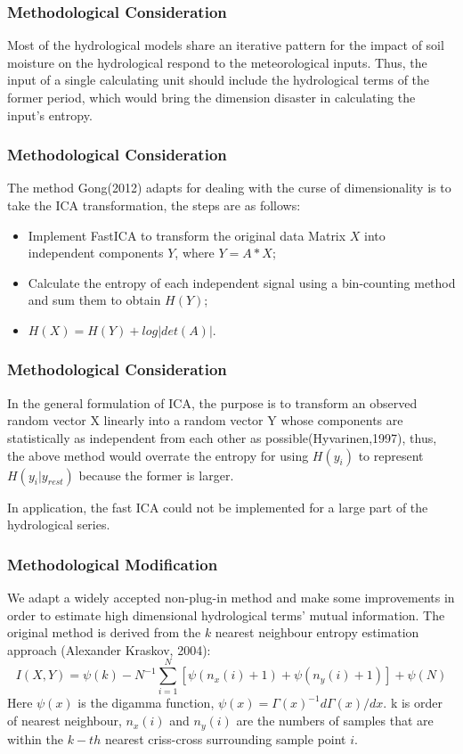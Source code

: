 \documentclass{beamer}
\begin{document}
\begin{CJK}{UTF8}{gkai}
\begin{frame}
\frametitle{Methodological Consideration}
Most of the hydrological models share an iterative pattern for the impact of soil moisture on the hydrological respond to the meteorological inputs. Thus, the input of a single calculating unit should include the hydrological terms of the former period, which would bring the dimension disaster in calculating the input's entropy.

\end{frame}

\begin{frame}
\frametitle{Methodological Consideration}

The method Gong(2012) adapts for dealing with the curse of dimensionality is to take the ICA transformation, the steps are as follows:
\begin{itemize}
\item Implement FastICA to transform the original data Matrix $X$ into independent components $Y$, where $Y=A*X$;
\item Calculate the entropy of each independent signal using a bin-counting method and sum them to obtain $H(Y)$;
\item $H(X)=H(Y)+log|det(A)|$.
\end{itemize}

\end{frame}

\begin{frame}
\frametitle{Methodological Consideration}
In the general formulation of ICA, the purpose is to transform an observed random vector X linearly into a random vector Y whose components are statistically as independent from each other as possible(Hyvarinen,1997), thus, the above method would overrate the entropy for using $H(y_i)$ to represent $H(y_i|y_{rest})$ because the former is larger.
 
In application, the fast ICA could not be implemented for a large part of the hydrological series.
\end{frame}

\begin{frame}
\frametitle{Methodological Modification}
We adapt a widely accepted non-plug-in method and make some improvements in order to estimate high dimensional hydrological terms' mutual information. The original method is derived from the $k$ nearest neighbour entropy estimation approach (Alexander Kraskov, 2004):
\begin{equation*}
I(X,Y)=\psi(k)-N^{-1}\sum_{i=1}^{N}[\psi(n_x(i)+1)+\psi(n_y(i)+1)]+\psi(N)
\end{equation*}
Here $\psi(x)$ is the digamma function, $\psi(x)=\Gamma(x)^{-1}d\Gamma(x)/dx$. k is order of nearest neighbour, $n_x(i)$ and $n_y(i)$ are the numbers of samples that are within the $k-th$ nearest  criss-cross surrounding sample point $i$.



\end{frame}
\end{CJK}
\end{document}
